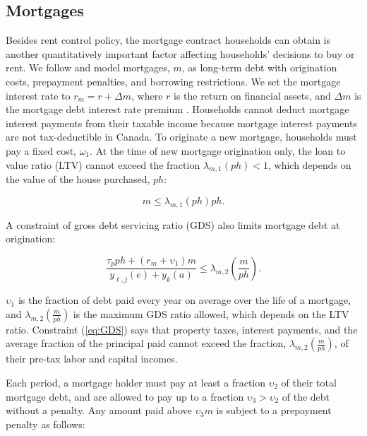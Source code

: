 \documentclass[parskip=full]{article}
\begin{document}
\subsection{Mortgages}\label{subsection:morgtages}

Besides rent control policy, the mortgage contract households can obtain is another quantitatively important factor affecting households' decisions to buy or rent. We follow \citet{rs-2023} and model mortgages, $m$, as long-term debt with origination costs, prepayment penalties, and borrowing restrictions. We set the mortgage interest rate to $r_{m}=r+\Delta m$, where $r$ is the return on financial assets, and $\Delta m$ is the mortgage debt interest rate premium \citep{sommeretal-2013,sommersullivan-2017,kaplanetal-2019}. Households cannot deduct mortgage interest payments from their taxable income because mortgage interest payments are not tax-deductible in Canada. To originate a new mortgage, households must pay a fixed cost, $\omega_{1}$. At the time of new mortgage origination only, the loan to value ratio (LTV) cannot exceed the fraction $\lambda_{m,1}(ph)<1$, which depends on the value of the house purchased, $ph$:

\begin{equation}\label{eq:LTV}
m \leq \lambda_{m,1}(ph) p h.
\end{equation}

\noindent A constraint of gross debt servicing ratio (GDS) also limits mortgage debt at origination: 

\begin{equation}\label{eq:GDS}
\frac{\tau_{p}ph+(r_{m}+\upsilon_{1})m}{y_{\ell,j}(e)+y_{k}(a)} \leq \lambda_{m,2}\left(\frac{m}{ph}\right).
\end{equation}

\noindent $\upsilon_{1}$ is the fraction of debt paid every year on average over the life of a mortgage, and $\lambda_{m,2}\left(\frac{m}{ph}\right)$ is the maximum GDS ratio allowed, which depends on the LTV ratio. Constraint (\ref{eq:GDS}) says that property taxes, interest payments, and the average fraction of the principal paid cannot exceed the fraction, $\lambda_{m,2}\left(\frac{m}{ph}\right)$, of their pre-tax labor and capital incomes. 

Each period, a mortgage holder must pay at least a fraction $\upsilon_{2}$ of their total mortgage debt, and are allowed to pay up to a fraction $\upsilon_{3}>\upsilon_{2}$ of the debt without a penalty. Any amount paid above $\upsilon_{3}m$ is subject to a prepayment penalty as follows: 
\end{document}
